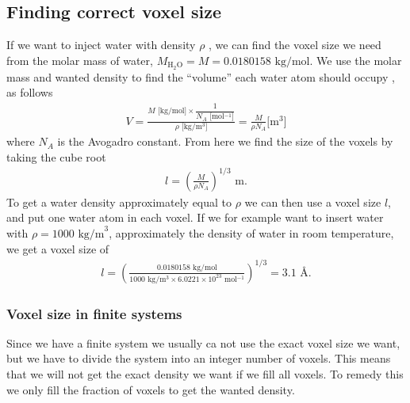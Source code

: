 \subsection{Finding correct voxel size}
If we want to inject water with density $\rho$%
, we can find the voxel size we need from the molar mass of water, $M_\text{H$_2$O} = M = 0.0180158 \text{ kg/mol}$. We use the molar mass and wanted density to find the ``volume'' each water atom should occupy%
, as follows
\begin{align*}
    V 
    = \frac{ M\text{ [kg/mol]} \times \dfrac{1}{N_A \text{ [mol$^{-1}$]}}}{ \rho\text{ [kg/m$^3$]} } 
    = \frac{M}{\rho N_A}\text{[m$^3$]}
\end{align*}
where $N_A$ is the Avogadro constant. From here we find the size of the voxels by taking the cube root
\begin{align}
    l = \left(\frac{M}{\rho N_A} \right)^{1/3}\text{ m}.
    \label{eq:inject_water_voxel_size}
\end{align}
To get a water density approximately equal to $\rho$ we can then use a voxel size $l$, and put one water atom in each voxel. If we for example want to insert water with $\rho = 1000\text{ kg/m}^3$, approximately the density of water in room temperature, we get a voxel size of
\begin{align*}
    l = \left(\frac{0.0180158 \text{ kg/mol}}{1000\text{ kg/m$^3$} \times 6.0221 \times 10^{23}\text{ mol$^{-1}$}} \right)^{1/3} = 3.1 \text{ \AA}.
\end{align*}

\subsubsection{Voxel size in finite systems}
Since we have a finite system we usually ca not use the exact voxel size we want, but we have to divide the system into an integer number of voxels. This means that we will not get the exact density we want if we fill all voxels. To remedy this we only fill the fraction of voxels to get the wanted density.

